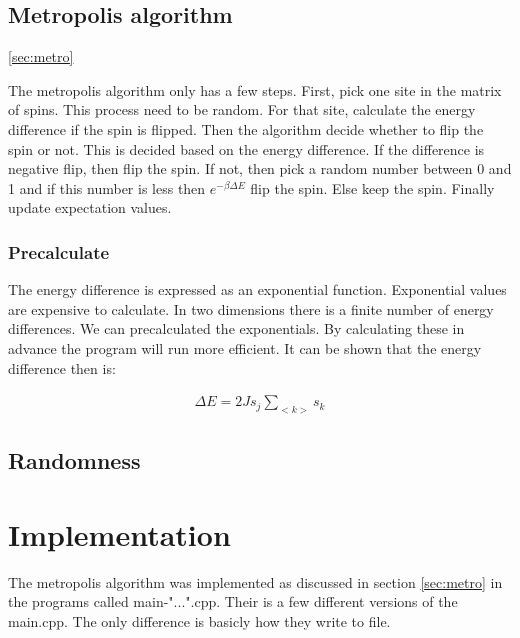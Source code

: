 
\subsection{Metropolis algorithm}\ref{sec:metro}

The metropolis algorithm only has a few steps. First, pick one site in the matrix of spins. This process need to be random. For that site, calculate the energy difference if the spin is flipped. Then the algorithm decide whether to flip the spin or not. This is decided based on the energy difference. If the difference is negative flip, then flip the spin. If not, then pick a random number between 0 and 1 and if this number is less then $e^{-\beta \Delta E}$ flip the spin. Else keep the spin. Finally update expectation values.

\subsubsection{Precalculate}

The energy difference is expressed as an exponential function. Exponential values are expensive to calculate. In two dimensions there is a finite number of energy differences. We can precalculated the exponentials. By calculating these in advance the program will run more efficient. It can be shown that the energy difference then is:

\begin{align*}
	\Delta E = 2J s_j \sum_{<k>} s_k
\end{align*}


\subsection{Randomness}



\section{Implementation}


The metropolis algorithm was implemented as discussed in section \ref{sec:metro} in the programs called main-"...".cpp. Their is a few different versions of the main.cpp. The only difference is basicly how they write to file. \href{https://github.com/erikfsk/Project-4/tree/master/Project4}{\color{blue}{github}}


